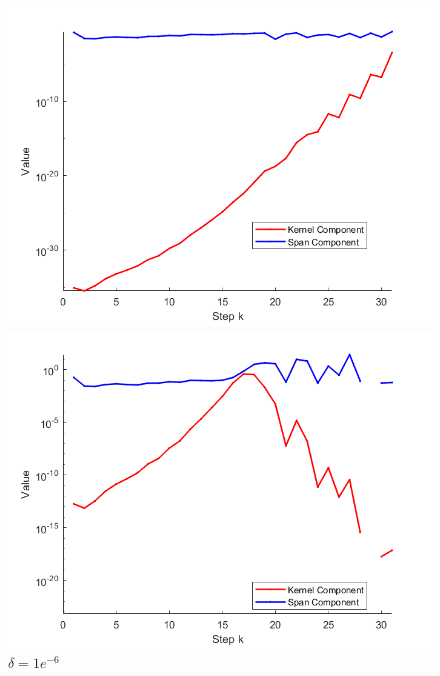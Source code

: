 \begin{figure}[htp]
    \centering
    \begin{minipage}{0.48\textwidth}
        \centering
        \includegraphics[width=\linewidth]{img/gamma1comp.png}
        \caption{\(\delta = 0\)}
    \end{minipage}
    \hfill
    \begin{minipage}{0.48\textwidth}
        \centering
        \includegraphics[width=\linewidth]{img/gamma2comp.png}
        \caption{\(\delta = 1e^{-6}\)}
    \end{minipage}
    \vfill
    \begin{minipage}{0.48\textwidth}
        \centering

\end{minipage}
\end{figure}
